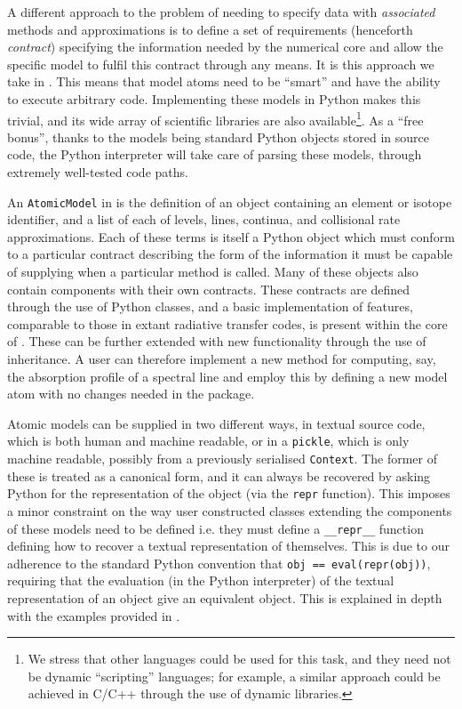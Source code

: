 A different approach to the problem of needing to specify data with \emph{associated} methods and approximations is to define a set of requirements (henceforth \emph{contract}) specifying the information needed by the numerical core and allow the specific model to fulfil this contract through any means.
It is this approach we take in \Lw{}.
This means that model atoms need to be ``smart'' and have the ability to execute arbitrary code.
Implementing these models in Python makes this trivial, and its wide array of scientific libraries are also available\footnote{We stress that other languages could be used for this task, and they need not be dynamic ``scripting'' languages; for example, a similar approach could be achieved in C/C++ through the use of dynamic libraries.}.
As a ``free bonus'', thanks to the models being standard Python objects stored in source code, the Python interpreter will take care of parsing these models, through extremely well-tested code paths.

An \texttt{AtomicModel} in \Lw{} is the definition of an object containing an element or isotope identifier, and a list of each of levels, lines, continua, and collisional rate approximations.
Each of these terms is itself a Python object which must conform to a particular contract describing the form of the information it must be capable of supplying when a particular method is called.
Many of these objects also contain components with their own contracts.
These contracts are defined through the use of Python classes, and a basic implementation of features, comparable to those in extant radiative transfer codes, is present within the core of  \Lw{}.
These can be further extended with new functionality through the use of inheritance.
A user can therefore implement a new method for computing, say, the absorption profile \citep[e.g. the non-Voigt profile of][]{Kowalski2017} of a spectral line and employ this by defining a new model atom with no changes needed in the \Lw{} package.

Atomic models can be supplied in two different ways, in textual source code, which is both human and machine readable, or in a \texttt{pickle}, which is only machine readable, possibly from a previously serialised \texttt{Context}.
The former of these is treated as a canonical form, and it can always be recovered by asking Python for the representation of the object (via the \texttt{repr} function).
This imposes a minor constraint on the way user constructed classes extending the components of these models need to be defined i.e. they must define a \texttt{\_\_repr\_\_} function defining how to recover a textual representation of themselves.
This is due to our adherence to the standard Python convention that \texttt{obj == eval(repr(obj))}, requiring that the evaluation (in the Python interpreter) of the textual representation of an object give an equivalent object.
This is explained in depth with the examples provided in \citet{Osborne2021}.

